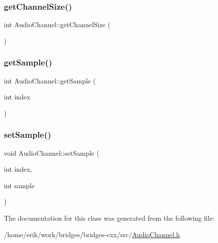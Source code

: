 \subsubsection{\texorpdfstring{get\+Channel\+Size()}{getChannelSize()}}
{\footnotesize\ttfamily int Audio\+Channel\+::get\+Channel\+Size (\begin{DoxyParamCaption}{ }\end{DoxyParamCaption})\hspace{0.3cm}{\ttfamily [inline]}}

\mbox{\label{class_audio_channel_aa63fe5d11906c24b150f3d6b5473c913}} 
\subsubsection{\texorpdfstring{get\+Sample()}{getSample()}}
{\footnotesize\ttfamily int Audio\+Channel\+::get\+Sample (\begin{DoxyParamCaption}\item[{int}]{index }\end{DoxyParamCaption})\hspace{0.3cm}{\ttfamily [inline]}}

\mbox{\label{class_audio_channel_a477b5173b05f969385802295bb479ed4}} 
\subsubsection{\texorpdfstring{set\+Sample()}{setSample()}}
{\footnotesize\ttfamily void Audio\+Channel\+::set\+Sample (\begin{DoxyParamCaption}\item[{int}]{index,  }\item[{int}]{sample }\end{DoxyParamCaption})\hspace{0.3cm}{\ttfamily [inline]}}



The documentation for this class was generated from the following file\+:\begin{DoxyCompactItemize}
\item 
/home/erik/work/bridges/bridges-\/cxx/src/\hyperlink{_audio_channel_8h}{Audio\+Channel.\+h}\end{DoxyCompactItemize}
